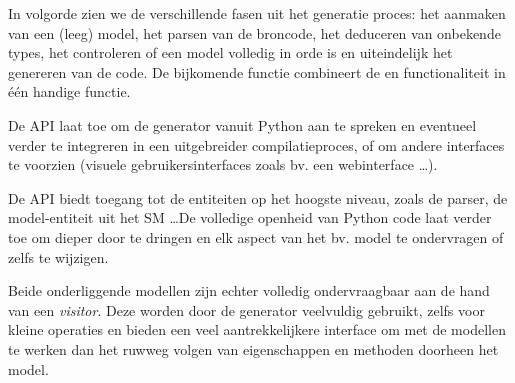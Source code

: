 In volgorde zien we de verschillende fasen uit het generatie proces: het
aanmaken van een (leeg) model, het parsen van de broncode, het deduceren van
onbekende types, het controleren of een model volledig in orde is en
uiteindelijk het genereren van de code. De bijkomende  functie
combineert de  en  functionaliteit in \'e\'en
handige functie.

De API laat toe om de generator vanuit Python aan te spreken en eventueel
verder te integreren in een uitgebreider compilatieproces, of om andere
interfaces te voorzien (visuele gebruikersinterfaces zoals bv. een
webinterface \dots).

De API biedt toegang tot de entiteiten op het hoogste niveau, zoals de parser,
de model-entiteit uit het SM \dots De volledige openheid van Python code laat
verder toe om dieper door te dringen en elk aspect van het bv. model te
ondervragen of zelfs te wijzigen.

Beide onderliggende modellen zijn echter volledig ondervraagbaar aan de hand
van een \emph{visitor}. Deze worden door de generator veelvuldig gebruikt,
zelfs voor kleine operaties en bieden een veel aantrekkelijkere interface om
met de modellen te werken dan het ruwweg volgen van eigenschappen en methoden
doorheen het model.
